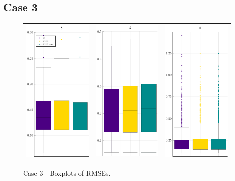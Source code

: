 \subsection{Case 3}
\begin{figure}[ht]
	
	\centering
	\begin{tabular}[b]{c c c}
		\includegraphics[width=.30\textwidth]{Figures/3/RMSE_b.pdf} & \includegraphics[width=.3\textwidth]{Figures/3/RMSE_a.pdf} & \includegraphics[width=.3\textwidth]{Figures/3/RMSE_t.pdf}
	\end{tabular}
\caption{Case 3 - Boxplots of RMSEs.}
	\label{fig:bpRMSE3}
\end{figure}
